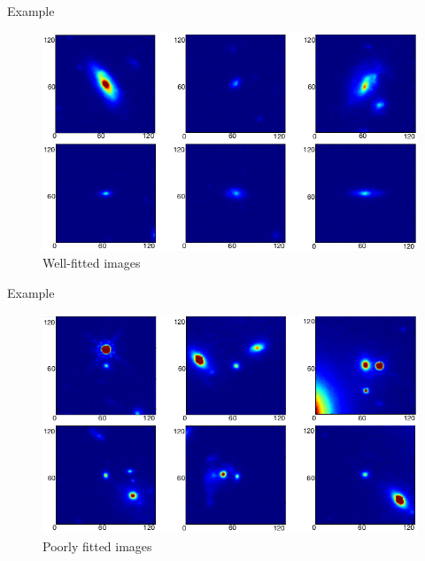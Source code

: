 \documentclass[xcolor=pdftex,dvipsnames,table,mathserif]{beamer}
\begin{document}
\begin{frame}{Example~\tiny\cite{tuccillo_deep_2018}}


    \begin{figure}[ht]
      \centering
      \includegraphics[width=\textwidth]{tuccillo_well_fitted}
      Well-fitted images
    \end{figure}

\end{frame}

\begin{frame}{Example~\tiny\cite{tuccillo_deep_2018}}


    \begin{figure}[ht]
      \centering
      \includegraphics[width=\textwidth]{tuccillo_poorly_fitted}
      Poorly fitted images
    \end{figure}

\end{frame}


\end{document}
